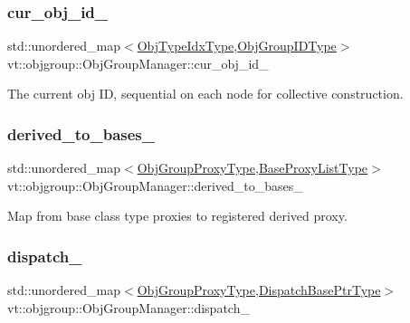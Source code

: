 \subsubsection{\texorpdfstring{cur\+\_\+obj\+\_\+id\+\_\+}{cur\_obj\_id\_}}
{\footnotesize\ttfamily std\+::unordered\+\_\+map$<$\hyperlink{namespacevt_1_1objgroup_a378e4b966221779c74f3a2f921eb2421}{Obj\+Type\+Idx\+Type},\hyperlink{namespacevt_1_1objgroup_a54a50ff6833bf618e5bedb9a3b6d0e07}{Obj\+Group\+I\+D\+Type}$>$ vt\+::objgroup\+::\+Obj\+Group\+Manager\+::cur\+\_\+obj\+\_\+id\+\_\+\hspace{0.3cm}{\ttfamily [private]}}



The current obj ID, sequential on each node for collective construction. 

\mbox{\label{structvt_1_1objgroup_1_1_obj_group_manager_aee25f043f12ed4447af6974acc5aa4cf}} 
\subsubsection{\texorpdfstring{derived\+\_\+to\+\_\+bases\+\_\+}{derived\_to\_bases\_}}
{\footnotesize\ttfamily std\+::unordered\+\_\+map$<$\hyperlink{namespacevt_ad7cae989df485fccca57f0792a880a8e}{Obj\+Group\+Proxy\+Type},\hyperlink{structvt_1_1objgroup_1_1_obj_group_manager_a497383a759f7426e824b4f7475b3d5d3}{Base\+Proxy\+List\+Type}$>$ vt\+::objgroup\+::\+Obj\+Group\+Manager\+::derived\+\_\+to\+\_\+bases\+\_\+\hspace{0.3cm}{\ttfamily [private]}}



Map from base class type proxies to registered derived proxy. 

\mbox{\label{structvt_1_1objgroup_1_1_obj_group_manager_af0a909e8963f651ba854ef6199612960}} 
\subsubsection{\texorpdfstring{dispatch\+\_\+}{dispatch\_}}
{\footnotesize\ttfamily std\+::unordered\+\_\+map$<$\hyperlink{namespacevt_ad7cae989df485fccca57f0792a880a8e}{Obj\+Group\+Proxy\+Type},\hyperlink{structvt_1_1objgroup_1_1_obj_group_manager_a8f2ded4cfa63faa119c2bd550764878f}{Dispatch\+Base\+Ptr\+Type}$>$ vt\+::objgroup\+::\+Obj\+Group\+Manager\+::dispatch\+\_\+\hspace{0.3cm}{\ttfamily [private]}}




